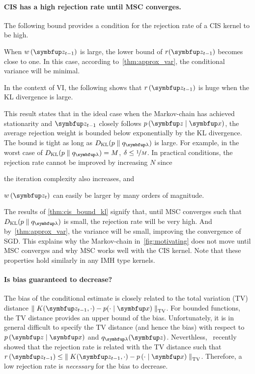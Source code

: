 \vspace{-0.1in}
\paragraph{CIS has a high rejection rate until MSC converges.}
The following bound provides a condition for the rejection rate of a CIS kernel to be high.
%

%
When \(w\,(\vz_{t-1})\) is large, the lower bound of \(r(\vz_{t-1})\) becomes close to one.
In this case, according to~\cref{thm:approx_var}, the conditional variance will be minimal.

In the context of VI, the following shows that \(r\,(\vz_{t-1})\) is huge when the KL divergence is large.
%

%
This result states that in the ideal case when the Markov-chain has achieved stationarity and \(\vz_{t-1}\) closely follows \(p\,(\vz\mid\vx)\), the average rejection weight is bounded below exponentially by the KL divergence.
The bound is tight as long as \(\DKL{p}{q_{\vlambda}}\) is large.
For example, in the worst case of \(\DKL{p}{q_{\vlambda}} = M\), \(\delta \leq \nicefrac{1}{M}\).
In practical conditions, the rejection rate cannot be improved by increasing \(N\) since
\begin{enumerate*}[label=(\roman*)]
  \item the iteration complexity also increases, and
  \item \(w\,(\vz_t)\) can easily be larger by many orders of magnitude.
\end{enumerate*}

The results of \cref{thm:cis_bound_kl} signify that, until MSC converges such that \(\DKL{p}{q_{\vlambda}}\) is small, the rejection rate will be very high.
And by~\cref{thm:approx_var}, the variance will be small, improving the convergence of SGD.
This explains why the Markov-chain in~\cref{fig:motivating} does not move until MSC converges and why MSC works well with the CIS kernel.
Note that these properties hold similarly in any IMH type kernels.


\vspace{-0.1in}
\paragraph{Is bias guaranteed to decrease?}
The bias of the conditional estimate is closely related to the total variation (TV) distance \(\DTV{K(\vz_{t-1}, \cdot)}{p(\cdot\mid\vx)}\).
For bounded functions, the TV distance provides an upper bound of the bias.
Unfortunately, it is in general difficult to specify the TV distance (and hence the bias) with respect to \(p\,(\vz\mid\vx)\) and \(q_{\vlambda}(\vz)\).
Neverthless,~\citet{wang_exact_2020} recently showed that the rejection rate is related with the TV distance such that \(r\,(\vz_{t-1}) \leq \DTV{K(\vz_{t-1}, \cdot)}{p\,(\cdot\mid\vx)}\).
Therefore, a low rejection rate is \textit{necessary} for the bias to decrease.


